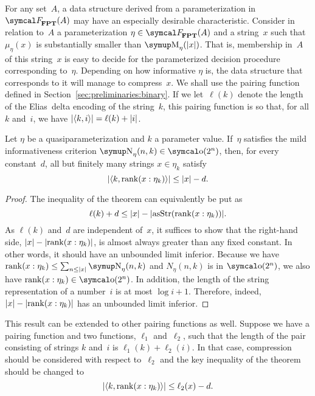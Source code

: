 For any set~$A$, a data structure derived from a parameterization in~$\calF_\cl{FPT}(A)$ may have an especially desirable characteristic.
Consider in relation to~$A$ a parameterization $\eta \in \calF_\cl{FPT}(A)$ and a string~$x$ such that $\mu_\eta(x)$ is substantially smaller than $\upM_\eta(\length{x})$.
That is, membership in~$A$ of this string~$x$ is easy to decide for the parameterized decision procedure corresponding to~$\eta$.
Depending on how informative $\eta$ is, the data structure that corresponds to it will manage to compress~$x$.
We shall use the pairing function defined in Section~\ref{sec:preliminaries:binary}.
If we let~$\ell(k)$ denote the length of the Elias~delta encoding of the string~$k$, this pairing function is so that, for all $k$ and~$i$, we have ${\lvert{\langle k, i\rangle}\rvert} = \ell(k) + {\lvert i\rvert}$.
\begin{theorem}
\label{thm:easycompressible}%
  Let $\eta$ be a quasiparameterization and $k$ a parameter value.
  If~$\eta$ satisfies the mild informativeness criterion $\upN_\eta(n, k) \in \littleo(2^n)$, then, for every constant~$d$, all but finitely many strings $x \in \eta_k$ satisfy
  \begin{equation*}
    {\lvert{\langle k, \operatorname{rank}(x : \eta_k)\rangle}\rvert} \le {\lvert x\rvert} - d.
  \end{equation*}
\end{theorem}
\begin{proof}
  The inequality of the theorem can equivalently be put as
  \begin{equation*}
    \ell(k) + d \le {\lvert x\rvert} - {\lvert\operatorname{asStr}(\operatorname{rank}(x : \eta_k))\rvert}.
  \end{equation*}
  As $\ell(k)$ and~$d$ are independent of~$x$, it suffices to show that the right-hand side, ${\lvert x\rvert} - {\lvert\operatorname{rank}(x : \eta_k)\rvert}$, is almost always greater than any fixed constant.
  In other words, it should have an unbounded limit inferior.
  Because we have $\rank(x : \eta_k) \le \sum_{n \le \length{x}} \upN_\eta(n, k)$ and $N_\eta(n, k)$ is in $\littleo(2^n)$, we also have $\rank(x : \eta_k) \in \littleo(2^n)$.
  In addition, the length of the string representation of a number~$i$ is at most $\log i + 1$.
  Therefore, indeed, ${\lvert x\rvert} - {\lvert\operatorname{rank}(x : \eta_k)\rvert}$ has an unbounded limit inferior.
\end{proof}

This result can be extended to other pairing functions as well.
Suppose we have a pairing function and two functions, $\ell_1$ and~$\ell_2$, such that the length of the pair consisting of strings $k$ and~$i$ is $\ell_1(k) + \ell_2(i)$.
In that case, compression should be considered with respect to~$\ell_2$ and the key inequality of the theorem should be changed to
\begin{equation*}
  {\lvert{\langle k, \operatorname{rank}(x : \eta_k)\rangle}\rvert} \le \ell_2(x) - d.
\end{equation*}

